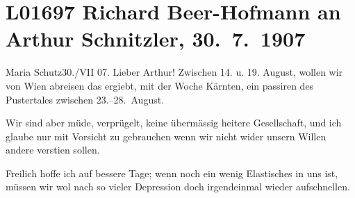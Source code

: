 

\section[Richard Beer-Hofmann an Arthur Schnitzler, 30. 7. 1907]{L01697 Richard Beer-Hofmann an Arthur Schnitzler, 30. 7. 1907}
\nopagebreak{}
\rehead{ }\normalsize\beginnumbering{}
\toendnotes[C]{\smallbreak\pagebreak[2]}
\toendnotes[C]{\smallbreak}
\pstart
           \raggedleft{}{\pb}Maria Schutz30./VII 07.\pend
           \vspace{0.5em}
\pstart
           Lieber Arthur! Zwischen 14. u. 19. August,
               wollen wir von Wien abreisen das ergiebt, mit der
               Woche Kärnten, ein passiren des Pustertales zwischen 23.–28. August.\pend
           
\pstart
           Wir sind aber müde, verprügelt, keine übermässig heitere Gesellschaft, und ich glaube
               nur mit Vorsicht zu gebrauchen wenn wir nicht wider unsern Willen andere versti{\geminationm}en sollen.\pend
           
\pstart
           {\pb}Freilich hoffe ich auf bessere
               Tage; wenn noch ein wenig Elastisches in uns ist, müssen wir wol nach so vieler
               Depression doch irgendeinmal wieder aufschnellen.\pend
           
